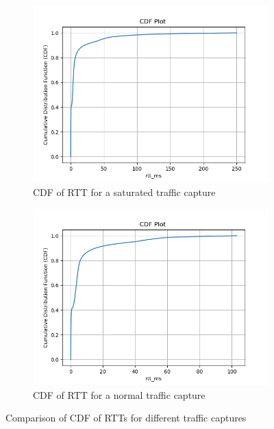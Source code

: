 \begin{figure}[t]
     \centering
     \begin{subfigure}[h]{0.49\textwidth}
         \centering
         \includegraphics[width=\textwidth]{Figures/rtt_cdf 1.png}
         \caption[CDF of RTT for a saturated traffic capture]{CDF of RTT for a saturated traffic capture}
         \label{fig:rtt1}
     \end{subfigure}
     \begin{subfigure}[h]{0.49\textwidth}
         \centering
         \includegraphics[width=\textwidth]{Figures/rtt_cdf1.png}
         \caption[CDF of RTT for a normal traffic capture]{CDF of RTT for a normal traffic capture}
         \label{fig:rtt2}
     \end{subfigure}
     \caption[Comparison of CDF of RTTs for different traffic captures]{Comparison of CDF of RTTs for different traffic captures}
     \label{fig:rttcomp}
     \bigskip
\end{figure}


